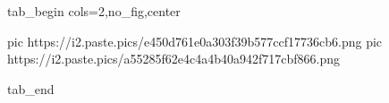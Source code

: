  
 
 
 
 


\ifcmt
  tab_begin cols=2,no_fig,center

     pic https://i2.paste.pics/e450d761e0a303f39b577ccf17736cb6.png
		 pic https://i2.paste.pics/a55285f62e4c4a4b40a942f717cbf866.png

  tab_end
\fi
